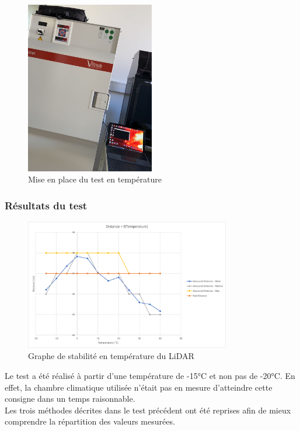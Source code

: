 \begin{figure}[H]
    \centering
    \includegraphics[width=0.5\textwidth]{Images/LiDAR/TempMes.jpeg}
    \caption{Mise en place du test en température}
    \label{TempError}
\end{figure}

\subsubsection{Résultats du test}

\begin{figure}[H]
    \centering
    \includegraphics[width=0.8\textwidth]{Images/LiDAR/LiDAR_TempStabilityGraph.png}
    \caption{Graphe de stabilité en température du LiDAR}
    \label{TempErrorGraph}
\end{figure}

Le test a été réalisé à partir d'une température de -15°C et non pas de -20°C. En effet, la chambre
climatique utilisée n'était pas en mesure d'atteindre cette consigne dans un temps raisonnable.\\
Les trois méthodes décrites dans le test précédent ont été reprises afin de mieux comprendre la
répartition des valeurs mesurées.

